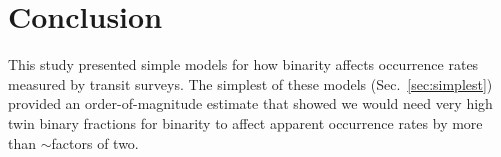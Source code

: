 \documentclass[12pt,modern]{aastex61}
\begin{document}

%

\section{Conclusion}
\label{sec:conclusion}

This study presented simple models for how binarity affects occurrence 
rates measured by transit surveys.
The simplest of these models (Sec.~\ref{sec:simplest}) provided an 
order-of-magnitude estimate that showed we would need very high twin binary 
fractions for binarity to affect apparent occurrence rates by more than 
$\sim$factors of two.
\end{document}
